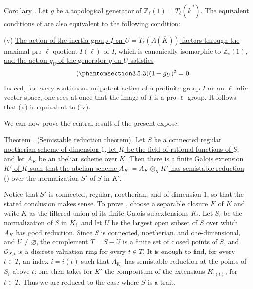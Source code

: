 \medskip
\noindent
\underline{Corollary} . \underline{Let $g$ be a topological generator
of $\mathbb Z_\ell(1)=T_\ell(\overline k^{\,*})$.  The equivalent conditions
of  are also equivalent to the following condition:}

\smallskip
\noindent
(v) \underline{The action of the inertia group $I$ on
$U=T_\ell(A(\overline K))$ factors through the maximal pro-$\ell$ quotient
$I(\ell)$ of $I$, which is canonically isomorphic to $\mathbb Z_\ell(1)$,
and the action $g_U$ of the generator $g$ on $U$ satisfies}
\begin{equation}\tag{\SGARefTarget{sga7.sga7i.eix.n3-5-3}{3.5.3}}
 (1-g_U)^2=0.
\end{equation}
Indeed, for every continuous unipotent action of a profinite group $I$ on
an $\ell$-adic vector space, one sees at once that the image of $I$ is a
pro-$\ell$ group.  It follows that (v) is equivalent to (iv).

We can now prove the central result of the present expose:

\medskip
\noindent
\underline{Theorem} . \underline{(Semistable reduction theorem).  Let
$S$ be a connected regular noetherian scheme of dimension $1$, let $K$ be
the field of rational functions of $S$, and let $A_K$ be an abelian scheme
over $K$.  Then there is a finite Galois extension $K'$ of $K$ such that
the abelian scheme $A_{K'}=A_K\otimes_KK'$ has semistable reduction} ()
\underline{over the normalization $S'$ of $S$ in $K'$.}

Notice that $S'$ is connected, regular, noetherian, and of dimension $1$,
so that the stated conclusion makes sense.  To prove , choose a
separable closure $\overline K$ of $K$ and write $\overline K$ as the
filtered union of its finite Galois subextensions $K_i$.  Let $S_i$ be the
normalization of $S$ in $K_i$, and let $U$ be the largest open subset of
$S$ over which $A_K$ has good reduction.  Since $S$ is connected,
noetherian, and one-dimensional, and $U\ne\varnothing$, the complement
$T=S-U$ is a finite set of closed points of $S$, and
$\mathcal O_{S,t}$ is a discrete valuation ring for every $t\in T$.  It is
enough to find, for every $t\in T$, an index $i=i(t)$ such that $A_{K_i}$
has semistable reduction at the points of $S_i$ above $t$: one then takes
for $K'$ the compositum of the extensions $K_{i(t)}$, for $t\in T$.
Thus we are reduced to the case where $S$ is a trait.

